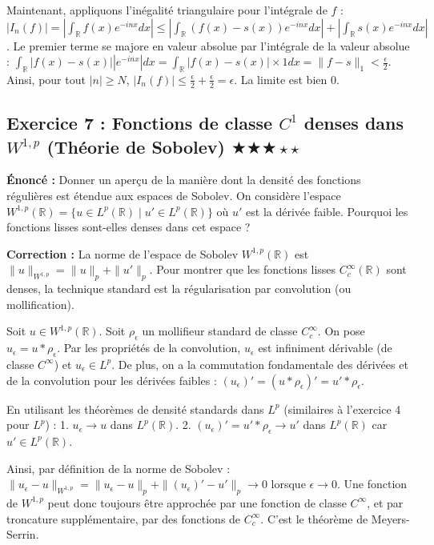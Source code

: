 \documentclass[11pt,a4paper]{article}
\begin{document}
Maintenant, appliquons l'inégalité triangulaire pour l'intégrale de $f$ :
$|I_n(f)| = \left| \int_{\mathbb{R}} f(x) e^{-inx} dx \right| \le \left| \int_{\mathbb{R}} (f(x) - s(x)) e^{-inx} dx \right| + \left| \int_{\mathbb{R}} s(x) e^{-inx} dx \right|$.
Le premier terme se majore en valeur absolue par l'intégrale de la valeur absolue :
$\int_{\mathbb{R}} |f(x) - s(x)| |e^{-inx}| dx = \int_{\mathbb{R}} |f(x) - s(x)| \times 1 dx = \| f - s \|_1 < \frac{\epsilon}{2}$.
Ainsi, pour tout $|n| \ge N$, $|I_n(f)| \le \frac{\epsilon}{2} + \frac{\epsilon}{2} = \epsilon$.
La limite est bien $0$.


\subsection*{Exercice 7 : Fonctions de classe $C^1$ denses dans $W^{1,p}$ (Théorie de Sobolev) \quad $\bigstar\bigstar\bigstar\star\star$}

\textbf{Énoncé :}
Donner un aperçu de la manière dont la densité des fonctions régulières est étendue aux espaces de Sobolev. On considère l'espace $W^{1,p}(\mathbb{R}) = \{u \in L^p(\mathbb{R}) \mid u' \in L^p(\mathbb{R})\}$ où $u'$ est la dérivée faible. Pourquoi les fonctions lisses sont-elles denses dans cet espace ?

\textbf{Correction :}
La norme de l'espace de Sobolev $W^{1,p}(\mathbb{R})$ est $\| u \|_{W^{1,p}} = \| u \|_p + \| u' \|_p$.
Pour montrer que les fonctions lisses $C_c^\infty(\mathbb{R})$ sont denses, la technique standard est la régularisation par convolution (ou mollification).

Soit $u \in W^{1,p}(\mathbb{R})$. Soit $\rho_\epsilon$ un mollifieur standard de classe $C_c^\infty$.
On pose $u_\epsilon = u * \rho_\epsilon$.
Par les propriétés de la convolution, $u_\epsilon$ est infiniment dérivable (de classe $C^\infty$) et $u_\epsilon \in L^p$.
De plus, on a la commutation fondamentale des dérivées et de la convolution pour les dérivées faibles :
$(u_\epsilon)' = (u * \rho_\epsilon)' = u' * \rho_\epsilon$.

En utilisant les théorèmes de densité standards dans $L^p$ (similaires à l'exercice 4 pour $L^p$) :
1. $u_\epsilon \to u$ dans $L^p(\mathbb{R})$.
2. $(u_\epsilon)' = u' * \rho_\epsilon \to u'$ dans $L^p(\mathbb{R})$ car $u' \in L^p(\mathbb{R})$.

Ainsi, par définition de la norme de Sobolev :
$\| u_\epsilon - u \|_{W^{1,p}} = \| u_\epsilon - u \|_p + \| (u_\epsilon)' - u' \|_p \to 0$ lorsque $\epsilon \to 0$.
Une fonction de $W^{1,p}$ peut donc toujours être approchée par une fonction de classe $C^\infty$, et par troncature supplémentaire, par des fonctions de $C_c^\infty$. C'est le théorème de Meyers-Serrin.
\end{document}
